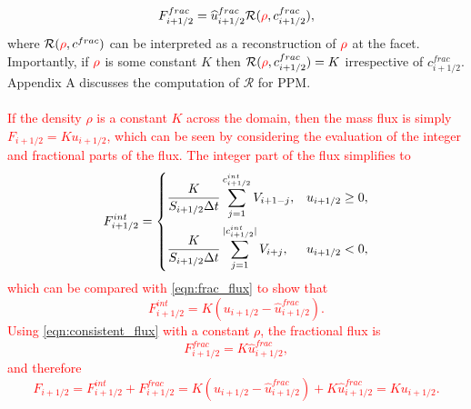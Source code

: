 \documentclass{ametsocV6.1}
\newcommand{\change}[1]{\textcolor{red}{#1}}
\begin{document}
\begin{equation} \label{eqn:consistent_flux}
F_{i+1/2}^{frac} = \widehat{u}_{i+1/2}^{frac} \mathcal{R}(\change{\rho},c_{i+1/2}^{frac}),
\end{equation}
where $\mathcal{R}(\change{\rho},c^{frac})$ can be interpreted as a reconstruction of $\change{\rho}$ at the facet.
Importantly, if $\change{\rho}$ is some constant $K$ then $\mathcal{R}(\change{\rho},c_{i+1/2}^{frac})=K$ irrespective of $c_{i+1/2}^{frac}$.
Appendix A discusses the computation of $\mathcal{R}$ for PPM. \\
\\
\change{If the density $\rho$ is a constant $K$ across the domain, then the mass flux is simply $F_{i+1/2}=Ku_{i+1/2}$, which can be seen by considering the evaluation of the integer and fractional parts of the flux.
The integer part of the flux simplifies to
\begin{equation}
    F^{int}_{i+1/2} = 
    \begin{dcases}
        \frac{K}{S_{i+1/2}\Delta{t}}\sum_{j=1}^{c_{i+1/2}^{int}}  V_{i+1-j}, & u_{i+1/2} \geq 0, \\
        \frac{K}{S_{i+1/2}\Delta{t}}\sum_{j=1}^{|c_{i+1/2}^{int}|} V_{i+j}, & u_{i+1/2} < 0,
    \end{dcases}
\end{equation}
which can be compared with \eqref{eqn:frac_flux} to show that
\begin{equation}
F^{int}_{i+1/2} = K\left(u_{i+1/2} - \widehat{u}^{frac}_{i+1/2}\right).
\end{equation}
Using \eqref{eqn:consistent_flux} with a constant $\rho$, the fractional flux is
\begin{equation}
F^{frac}_{i+1/2}=K\widehat{u}^{frac}_{i+1/2},
\end{equation}
and therefore
\begin{equation}
F_{i+1/2}=F^{int}_{i+1/2}+F_{i+1/2}^{frac} = K\left(u_{i+1/2} - \widehat{u}^{frac}_{i+1/2}\right) + K\widehat{u}^{frac}_{i+1/2} = Ku_{i+1/2}.
\end{equation}
}
\end{document}

